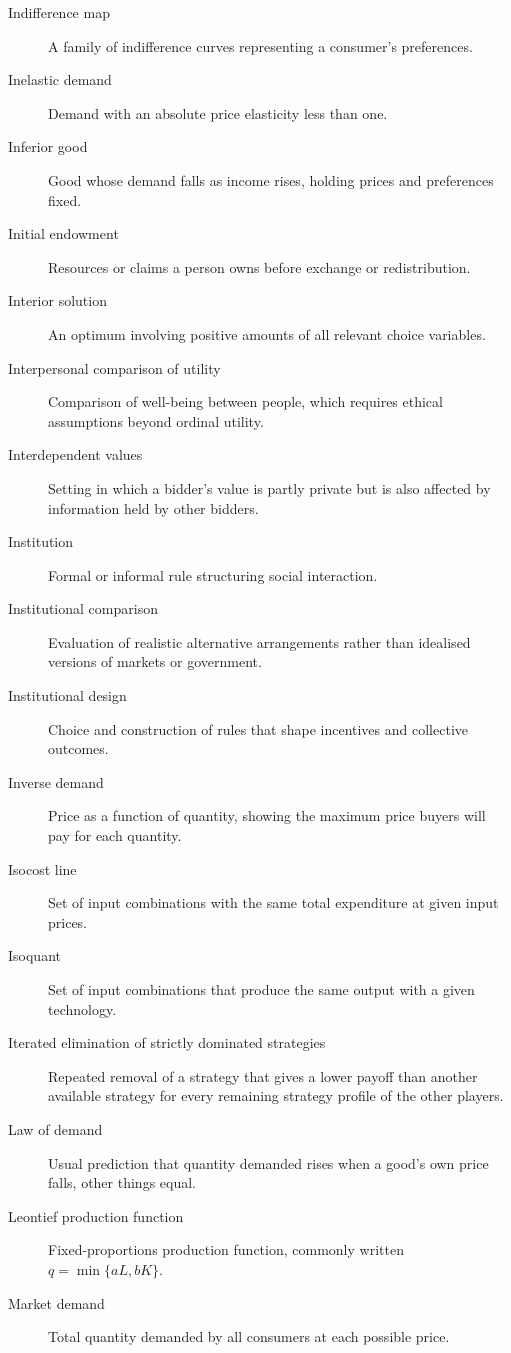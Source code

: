 \begin{description}
  \item[Indifference map] A family of indifference curves representing a consumer's preferences.
  \item[Inelastic demand] Demand with an absolute price elasticity less than one.
  \item[Inferior good] Good whose demand falls as income rises, holding prices and preferences fixed.
  \item[Initial endowment] Resources or claims a person owns before exchange or redistribution.
  \item[Interior solution] An optimum involving positive amounts of all relevant choice variables.
  \item[Interpersonal comparison of utility] Comparison of well-being between people, which requires ethical assumptions beyond ordinal utility.
  \item[Interdependent values] Setting in which a bidder's value is partly private but is also affected by information held by other bidders.
  \item[Institution] Formal or informal rule structuring social interaction.
  \item[Institutional comparison] Evaluation of realistic alternative arrangements rather than idealised versions of markets or government.
  \item[Institutional design] Choice and construction of rules that shape incentives and collective outcomes.
  \item[Inverse demand] Price as a function of quantity, showing the maximum price buyers will pay for each quantity.
  \item[Isocost line] Set of input combinations with the same total expenditure at given input prices.
  \item[Isoquant] Set of input combinations that produce the same output with a given technology.
  \item[Iterated elimination of strictly dominated strategies] Repeated removal of a strategy that gives a lower payoff than another available strategy for every remaining strategy profile of the other players.
  \item[Law of demand] Usual prediction that quantity demanded rises when a good's own price falls, other things equal.
  \item[Leontief production function] Fixed-proportions production function, commonly written $q=\min\{aL,bK\}$.
  \item[Market demand] Total quantity demanded by all consumers at each possible price.

\end{description}
